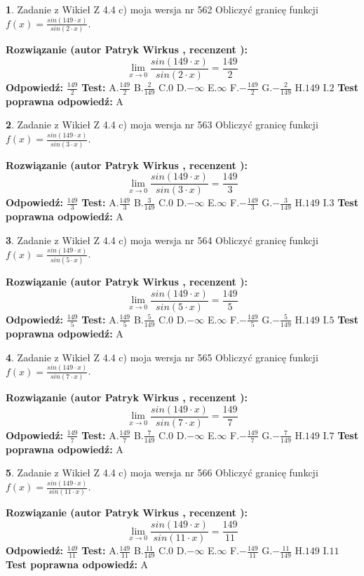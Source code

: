 \documentclass[12pt, a4paper]{article}
\theoremstyle{definition} %
\newtheorem{zad}{}
\newcommand{\zadStart}[1]{\begin{zad}#1\newline}
\newcommand{\zadStop}{\end{zad}}
\newcommand{\rozwStart}[2]{\noindent \textbf{Rozwiązanie (autor #1 , recenzent #2): }\newline}
\newcommand{\rozwStop}{\newline}
\newcommand{\odpStart}{\noindent \textbf{Odpowiedź:}\newline}
\newcommand{\odpStop}{\newline}
\newcommand{\testStart}{\noindent \textbf{Test:}\newline}
\newcommand{\testStop}{\newline}
\newcommand{\kluczStart}{\noindent \textbf{Test poprawna odpowiedź:}\newline}
\newcommand{\kluczStop}{\newline}
\begin{document}
\zadStart{Zadanie z Wikieł Z 4.4 c) moja wersja nr 562}
Obliczyć granicę funkcji $f(x)=\frac{sin(149\cdot x)}{sin(2\cdot x)}$.
\zadStop
\rozwStart{Patryk Wirkus}{}
$$\lim\limits_{x\to 0}\frac{sin(149\cdot x)}{sin(2\cdot x)}=
\frac{149}{2}$$
\rozwStop
\odpStart
$\frac{149}{2}$
\odpStop
\testStart
A.$\frac{149}{2}$
B.$\frac{2}{149}$
C.$0$
D.$-\infty$
E.$\infty$
F.$-\frac{149}{2}$
G.$-\frac{2}{149}$
H.$149$
I.$2$
\testStop
\kluczStart
A
\kluczStop



\zadStart{Zadanie z Wikieł Z 4.4 c) moja wersja nr 563}
Obliczyć granicę funkcji $f(x)=\frac{sin(149\cdot x)}{sin(3\cdot x)}$.
\zadStop
\rozwStart{Patryk Wirkus}{}
$$\lim\limits_{x\to 0}\frac{sin(149\cdot x)}{sin(3\cdot x)}=
\frac{149}{3}$$
\rozwStop
\odpStart
$\frac{149}{3}$
\odpStop
\testStart
A.$\frac{149}{3}$
B.$\frac{3}{149}$
C.$0$
D.$-\infty$
E.$\infty$
F.$-\frac{149}{3}$
G.$-\frac{3}{149}$
H.$149$
I.$3$
\testStop
\kluczStart
A
\kluczStop



\zadStart{Zadanie z Wikieł Z 4.4 c) moja wersja nr 564}
Obliczyć granicę funkcji $f(x)=\frac{sin(149\cdot x)}{sin(5\cdot x)}$.
\zadStop
\rozwStart{Patryk Wirkus}{}
$$\lim\limits_{x\to 0}\frac{sin(149\cdot x)}{sin(5\cdot x)}=
\frac{149}{5}$$
\rozwStop
\odpStart
$\frac{149}{5}$
\odpStop
\testStart
A.$\frac{149}{5}$
B.$\frac{5}{149}$
C.$0$
D.$-\infty$
E.$\infty$
F.$-\frac{149}{5}$
G.$-\frac{5}{149}$
H.$149$
I.$5$
\testStop
\kluczStart
A
\kluczStop



\zadStart{Zadanie z Wikieł Z 4.4 c) moja wersja nr 565}
Obliczyć granicę funkcji $f(x)=\frac{sin(149\cdot x)}{sin(7\cdot x)}$.
\zadStop
\rozwStart{Patryk Wirkus}{}
$$\lim\limits_{x\to 0}\frac{sin(149\cdot x)}{sin(7\cdot x)}=
\frac{149}{7}$$
\rozwStop
\odpStart
$\frac{149}{7}$
\odpStop
\testStart
A.$\frac{149}{7}$
B.$\frac{7}{149}$
C.$0$
D.$-\infty$
E.$\infty$
F.$-\frac{149}{7}$
G.$-\frac{7}{149}$
H.$149$
I.$7$
\testStop
\kluczStart
A
\kluczStop



\zadStart{Zadanie z Wikieł Z 4.4 c) moja wersja nr 566}
Obliczyć granicę funkcji $f(x)=\frac{sin(149\cdot x)}{sin(11\cdot x)}$.
\zadStop
\rozwStart{Patryk Wirkus}{}
$$\lim\limits_{x\to 0}\frac{sin(149\cdot x)}{sin(11\cdot x)}=
\frac{149}{11}$$
\rozwStop
\odpStart
$\frac{149}{11}$
\odpStop
\testStart
A.$\frac{149}{11}$
B.$\frac{11}{149}$
C.$0$
D.$-\infty$
E.$\infty$
F.$-\frac{149}{11}$
G.$-\frac{11}{149}$
H.$149$
I.$11$
\testStop
\kluczStart
A
\kluczStop
\end{document}
